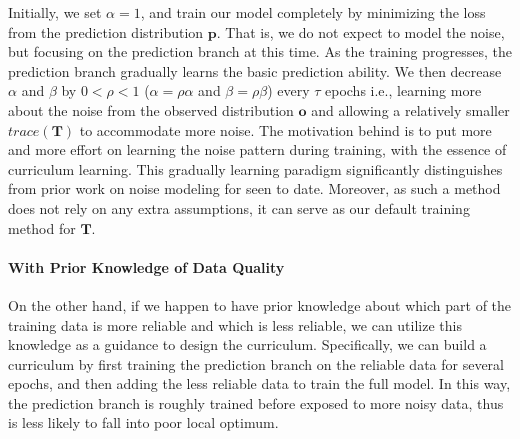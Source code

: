 Initially, we set $\alpha=1$, and train our model  completely by minimizing the loss from the prediction distribution $\mathbf{p}$. That is, we do not expect to model the noise,  but focusing  on the prediction branch at this time. As the training progresses, the prediction branch gradually learns the basic prediction ability. We then decrease $\alpha$ and  $\beta$ by $0<\rho<1$ ($\alpha=\rho\alpha$ and $\beta=\rho\beta$) every $\tau$ epochs i.e., learning more about the noise from the observed distribution $\mathbf{o}$ and allowing a relatively smaller $trace(\mathbf{T})$ to accommodate more noise.
The motivation behind is to put more and more effort on learning the noise pattern during training, 
with the essence of curriculum learning.
This gradually learning paradigm significantly distinguishes from prior work on noise modeling for \DS seen to date. 
Moreover, as such a method does not rely on any extra assumptions,
it can serve as our default training method for $\mathbf{T}$.

\paragraph{With Prior Knowledge of Data Quality}
On the other hand, if we happen to have prior knowledge about which part of the training data is more reliable and which is less reliable, we can utilize this knowledge as a guidance to design the curriculum.  
Specifically, we can build a curriculum by first training the prediction branch on the reliable data for several epochs, and then adding the less reliable data to train the full model. In this way, the prediction branch is roughly trained before exposed to more noisy data, thus is less likely to fall into poor local optimum.

